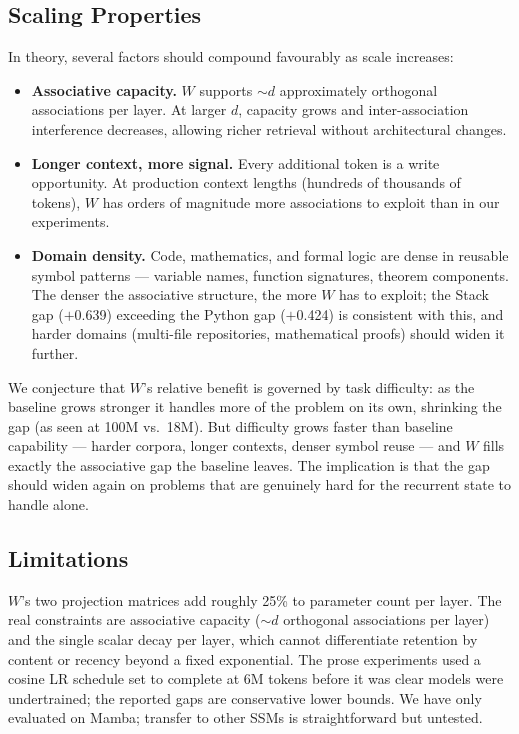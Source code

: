\documentclass{article}
\begin{document}
\subsection*{Scaling Properties}
In theory, several factors should compound favourably as scale increases:
\begin{itemize}
  \item \textbf{Associative capacity.} $W$ supports ${\sim}d$ approximately orthogonal associations per layer. At larger $d$, capacity grows and inter-association interference decreases, allowing richer retrieval without architectural changes.
  \item \textbf{Longer context, more signal.} Every additional token is a write opportunity. At production context lengths (hundreds of thousands of tokens), $W$ has orders of magnitude more associations to exploit than in our experiments.
  \item \textbf{Domain density.} Code, mathematics, and formal logic are dense in reusable symbol patterns --- variable names, function signatures, theorem components. The denser the associative structure, the more $W$ has to exploit; the Stack gap ($+$0.639) exceeding the Python gap ($+$0.424) is consistent with this, and harder domains (multi-file repositories, mathematical proofs) should widen it further.
\end{itemize}
We conjecture that $W$'s relative benefit is governed by task difficulty: as the baseline grows stronger it handles more of the problem on its own, shrinking the gap (as seen at 100M vs.\ 18M). But difficulty grows faster than baseline capability --- harder corpora, longer contexts, denser symbol reuse --- and $W$ fills exactly the associative gap the baseline leaves. The implication is that the gap should widen again on problems that are genuinely hard for the recurrent state to handle alone.

\subsection*{Limitations}
$W$'s two projection matrices add roughly 25\% to parameter count per layer. The real constraints are associative capacity (${\sim}d$ orthogonal associations per layer) and the single scalar decay per layer, which cannot differentiate retention by content or recency beyond a fixed exponential. The prose experiments used a cosine LR schedule set to complete at 6M tokens before it was clear models were undertrained; the reported gaps are conservative lower bounds. We have only evaluated on Mamba; transfer to other SSMs is straightforward but untested.
\end{document}
